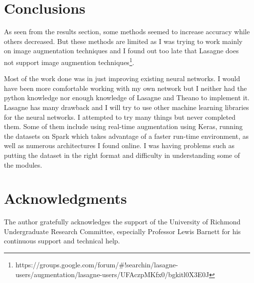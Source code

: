 \documentclass[11pt,twocolumn]{article}
\begin{document}
\section{Conclusions}

As seen from the results section, some methods seemed to increase accuracy while others decreased. But these methods are limited as I was trying to work mainly on image augmentation techniques and I found out too late that Lasagne does not support image augmention techniques\footnote{https://groups.google.com/forum/\#!searchin/lasagne-users/augmentation/lasagne-users/UFAczpMKfx0/bgkitl0X3E0J}.

Most of the work done was in just improving existing neural networks. I would have been more comfortable working with my own network but I neither had the python knowledge nor enough knowledge of Lasagne and Theano to implement it. Lasagne has many drawback and I will try to use other machine learning libraries for the neural networks. I attempted to try many things but never completed them. Some of them include using real-time augmentation using Keras, running the datasets on Spark which takes advantage of a faster run-time environment, as well as numerous architectures I found online. I was having problems such as putting the dataset in the right format and difficulty in understanding some of the modules. 

\section{Acknowledgments}
The author gratefully acknowledges the support of
the University of Richmond Undergraduate Research Committee, especially Professor Lewis Barnett for his continuous support and technical help. 

\newpage



\end{document}
